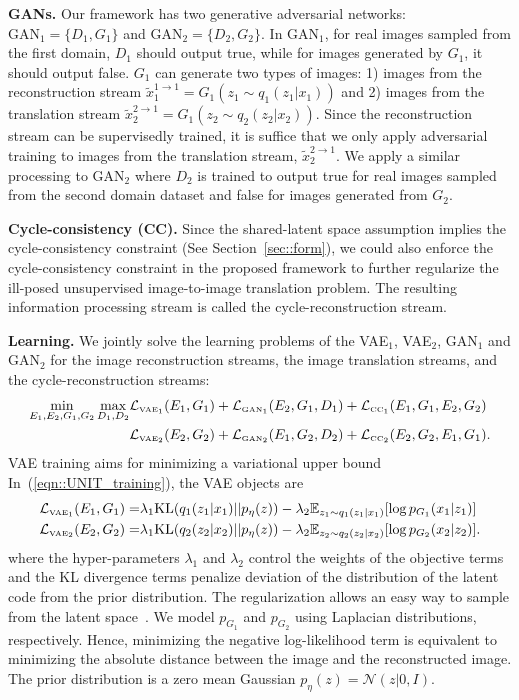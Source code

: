 \documentclass{article}
\begin{document}
{\bf GANs.} Our framework has two generative adversarial networks: $\text{GAN}_1=\{D_1,G_1\}$ and $\text{GAN}_2=\{D_2,G_2\}$. In $\text{GAN}_1$, for real images sampled from the first domain, $D_1$ should output true, while for images generated by $G_1$, it should output false. $G_1$ can generate two types of images: 1) images from the reconstruction stream $\tilde{x}_1^{1\rightarrow 1} = G_1 (z_1 \sim q_1 (z_1|x_1))$ and 2) images from the translation stream $\tilde{x}_2^{2\rightarrow 1} = G_1 (z_2 \sim q_2 (z_2|x_2))$. Since the reconstruction stream can be supervisedly trained, it is suffice that we only apply adversarial training to images from the translation stream, $\tilde{x}_2^{2\rightarrow 1}$. We apply a similar processing to $\text{GAN}_2$ where $D_2$ is trained to output true for real images sampled from the second domain dataset and false for images generated from $G_2$.

{\bf Cycle-consistency (CC).} Since the shared-latent space assumption implies the cycle-consistency constraint (See Section~\ref{sec::form}), we could also enforce the cycle-consistency constraint in the proposed framework to further regularize the ill-posed unsupervised image-to-image translation problem. The resulting information processing stream is called the cycle-reconstruction stream.

{\bf Learning.} We jointly solve the learning problems of the VAE$_1$, VAE$_2$, GAN$_1$ and GAN$_2$ for the image reconstruction streams, the image translation streams, and the cycle-reconstruction streams: 
\begin{align}
\min_{E_1,E_2,G_1,G_2} \max_{D_1,D_2} 
&\mathcal{L}_{\text{\tiny VAE}_1}(E_1,G_1) +\mathcal{L}_{\text{\tiny GAN}_1}(E_2,G_1,D_1) +\mathcal{L}_{\text{\tiny CC}_1}(E_1,G_1,E_2,G_2)\nonumber\\
&\mathcal{L}_{\text{\tiny VAE}_2}(E_2,G_2) + \mathcal{L}_{\text{\tiny GAN}_2}(E_1,G_2,D_2)+\mathcal{L}_{\text{\tiny CC}_2}(E_2,G_2,E_1,G_1)
\label{eqn::UNIT_training}.
\end{align}
VAE training aims for minimizing a variational upper bound In~(\ref{eqn::UNIT_training}), the VAE objects are 
\begin{align}
\mathcal{L}_{\text{\tiny VAE}_1}(E_1,G_1)=&\lambda_1 \text{KL}( q_1(z_1|x_1) || p_{\eta}(z) ) - \lambda_2 \mathbb{E}_{z_1 \sim q_1 (z_1|x_1)}[\log p_{G_1}(x_1|z_1)]\label{eqn::vae1}\\
\mathcal{L}_{\text{\tiny VAE}_2}(E_2,G_2)=&\lambda_1 \text{KL}( q_2(z_2|x_2) || p_{\eta}(z) ) - \lambda_2 \mathbb{E}_{z_2 \sim q_2 (z_2|x_2)}[\log p_{G_2}(x_2|z_2)].\label{eqn::vae2}
\end{align}
where the hyper-parameters $\lambda_1$ and $\lambda_2$ control the weights of the objective terms and the KL divergence terms penalize deviation of the distribution of the latent code from the prior distribution. The regularization allows an easy way to sample from the latent space~\cite{kingma2013auto}. We model $p_{G_1}$ and $p_{G_2}$ using Laplacian distributions, respectively. Hence, minimizing the negative log-likelihood term is equivalent to minimizing the absolute distance between the image and the reconstructed image. The prior distribution is a zero mean Gaussian $p_{\eta}(z)=\mathcal{N}(z|0,I)$.
\end{document}
